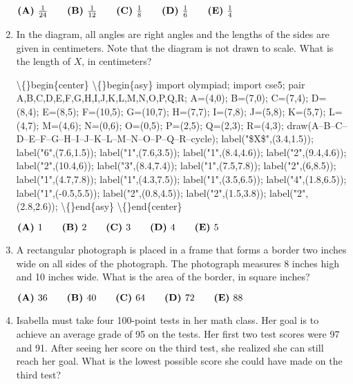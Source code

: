 \documentclass{article}
\begin{document}
\begin{enumerate}[label=\arabic*., itemsep=0.5em]
\( \textbf{(A)}\hspace{.05in}\frac{1}{24}\qquad\textbf{(B)}\hspace{.05in}\frac{1}{12}\qquad\textbf{(C)}\hspace{.05in}\frac{1}{8}\qquad\textbf{(D)}\hspace{.05in}\frac{1}{6}\qquad\textbf{(E)}\hspace{.05in}\frac{1}{4} \)\par \vspace{0.5em}\item In the diagram, all angles are right angles and the lengths of the sides are given in centimeters. Note that the diagram is not drawn to scale. What is the length of \( X \),  in centimeters?


\textbackslash\{\}begin\{center\}
\textbackslash\{\}begin\{asy\}
import olympiad;
import cse5;
pair A,B,C,D,E,F,G,H,I,J,K,L,M,N,O,P,Q,R;
A=(4,0);
B=(7,0);
C=(7,4);
D=(8,4);
E=(8,5);
F=(10,5);
G=(10,7);
H=(7,7);
I=(7,8);
J=(5,8);
K=(5,7);
L=(4,7);
M=(4,6);
N=(0,6);
O=(0,5);
P=(2,5);
Q=(2,3);
R=(4,3);
draw(A--B--C--D--E--F--G--H--I--J--K--L--M--N--O--P--Q--R--cycle);
label("\$X\$",(3.4,1.5));
label("6",(7.6,1.5));
label("1",(7.6,3.5));
label("1",(8.4,4.6));
label("2",(9.4,4.6));
label("2",(10.4,6));
label("3",(8.4,7.4));
label("1",(7.5,7.8));
label("2",(6,8.5));
label("1",(4.7,7.8));
label("1",(4.3,7.5));
label("1",(3.5,6.5));
label("4",(1.8,6.5));
label("1",(-0.5,5.5));
label("2",(0.8,4.5));
label("2",(1.5,3.8));
label("2",(2.8,2.6));
\textbackslash\{\}end\{asy\}
\textbackslash\{\}end\{center\}


\( \textbf{(A)}\hspace{.05in}1\qquad\textbf{(B)}\hspace{.05in}2\qquad\textbf{(C)}\hspace{.05in}3\qquad\textbf{(D)}\hspace{.05in}4\qquad\textbf{(E)}\hspace{.05in}5 \)\par \vspace{0.5em}\item A rectangular photograph is placed in a frame that forms a border two inches wide on all sides of the photograph. The photograph measures 8 inches high and 10 inches wide. What is the area of the border, in square inches?

\( \textbf{(A)}\hspace{.05in}36\qquad\textbf{(B)}\hspace{.05in}40\qquad\textbf{(C)}\hspace{.05in}64\qquad\textbf{(D)}\hspace{.05in}72\qquad\textbf{(E)}\hspace{.05in}88 \)\par \vspace{0.5em}\item Isabella must take four 100-point tests in her math class. Her goal is to achieve an average grade of 95 on the tests. Her first two test scores were 97 and 91. After seeing her score on the third test, she realized she can still reach her goal. What is the lowest possible score she could have made on the third test?


\end{enumerate}
\end{document}
